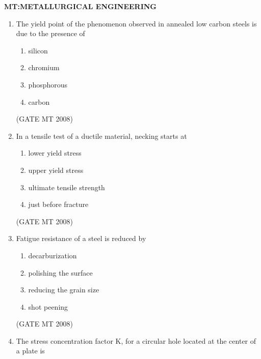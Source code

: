 \documentclass[11pt, letterpaper]{article}
\theoremstyle{remark}
\begin{document}
\begin{center}
{\large \textbf{MT:METALLURGICAL ENGINEERING}}
\end{center}    



\begin{enumerate}
\item The yield point of the phenomenon observed in annealed low carbon steels is due to the presence of

\begin{multicols}{4}
\begin{enumerate}
\item silicon
\item chromium
\item phosphorous 
\item carbon
\end{enumerate}
\end{multicols}

\hfill(GATE MT 2008)

\item In a tensile test of a ductile material, necking starts at

\begin{multicols}{2}
\begin{enumerate}
\item lower yield stress
\item upper yield stress
\item ultimate tensile strength
\item just before fracture
\end{enumerate}
\end{multicols}


\hfill(GATE MT 2008)

\item Fatigue resistance of a steel is reduced by

\begin{multicols}{2}
\begin{enumerate}
\item decarburization
\item polishing the surface
\item reducing the grain size
\item shot peening
\end{enumerate}
\end{multicols}


\hfill(GATE MT 2008)

\item The stress concentration factor K, for a circular hole located at the center of a plate is


\end{enumerate}
\end{document}
